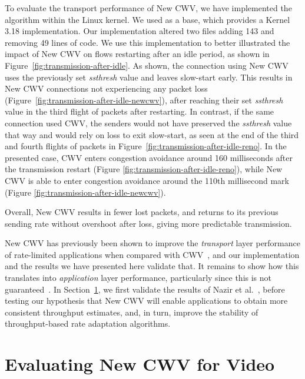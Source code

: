 \documentclass[10pt,sigconf]{acmart}
\begin{document}
To evaluate the transport performance of New CWV, we have implemented the algorithm within the Linux kernel. We used \cite{online-newcwv-base} as a base, which provides a Kernel 3.18 implementation. Our implementation altered two files adding 143 and removing 49 lines of code. We use this implementation to better illustrated the impact of New CWV on flows restarting after an idle period, as shown in Figure~\ref{fig:transmission-after-idle}.
As shown, the connection using New CWV uses the previously set \emph{ssthresh} value and leaves slow-start early. This results in New CWV connections not experiencing any packet loss (Figure~\ref{fig:transmission-after-idle-newcwv}), after reaching their set \emph{ssthresh} value in the third flight of packets after restarting. In contrast, if the same connection used CWV, the senders would not have preserved the \emph{ssthresh} value that way and would rely on loss to exit slow-start, as seen at the end of the third and fourth flights of packets in Figure~\ref{fig:transmission-after-idle-reno}. In the presented case, CWV enters congestion avoidance around 160 milliseconds after the transmission restart (Figure \ref{fig:transmission-after-idle-reno}), while New CWV is able to enter congestion avoidance around the 110th millisecond mark (Figure \ref{fig:transmission-after-idle-newcwv}).

Overall, New CWV results in fewer lost packets, and returns to its previous sending rate without overshoot after loss, giving more predictable transmission.

New CWV has previously been shown to improve the \emph{transport} layer performance of rate-limited applications when compared with CWV~\cite{Nazir-2014-performance-evaluation-congestion-window-validation-dash-newcwv}, and our implementation and the results we have presented here validate that. It remains to show how this translates into \emph{application} layer performance, particularly since this is not guaranteed~\cite{Spiteri-2016-BOLA}. In Section~\ref{sec:evaluation}, we first validate the results of Nazir et al.~\cite{Nazir-2014-performance-evaluation-congestion-window-validation-dash-newcwv}, before testing our hypothesis that New CWV will enable applications to obtain more consistent throughput estimates, and, in turn, improve the stability of throughput-based rate adaptation algorithms.

\section{Evaluating New CWV for Video}
\label{sec:evaluation}
\end{document}
